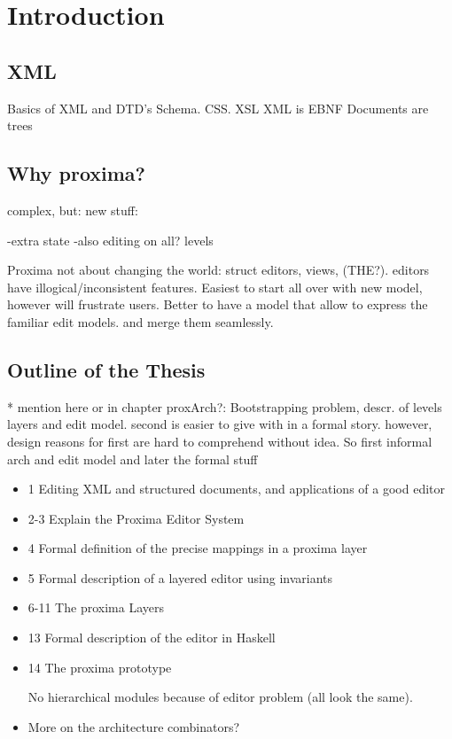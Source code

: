 \chapter{Introduction}
\label{chap:introduction}

\section{XML}
Basics of XML and DTD's  Schema. CSS. XSL
XML is EBNF 
Documents are trees


\section{Why proxima?}

complex, but:
new stuff:

-extra state
-also editing on all? levels

Proxima not about changing the world: struct editors, views, (THE?). editors have illogical/inconsistent features. Easiest to start all over with new model, however will frustrate users. Better to have a model that allow to express the familiar edit models. and merge them seamlessly.

\section{Outline of the Thesis}
* mention here or in chapter proxArch?:
Bootstrapping problem, descr. of levels layers and edit model. second is easier to give with in a formal story. however, design reasons for first are hard to comprehend without idea. So first informal arch and edit model and later the formal stuff

\begin{itemize}
\item 1 Editing XML and structured documents, and applications of a good editor
\item 2-3 Explain the Proxima Editor System
\item 4 Formal definition of the precise mappings in a proxima layer
\item 5 Formal description of a layered editor using invariants
\item 6-11 The proxima Layers 



\item 13 Formal description of the editor in Haskell
\item 14 The proxima prototype

No hierarchical modules because of editor problem (all look the same).

\item More on the architecture combinators?

\end{itemize}